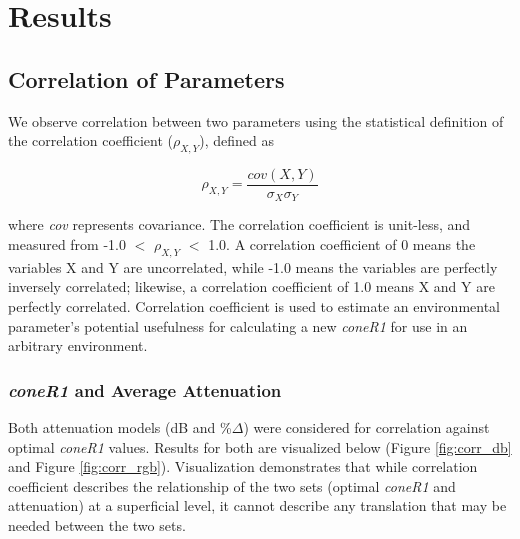 \documentclass[12pt]{report}
\begin{document}
\doublespacing

\clearpage
\chapter{Results}

\section{Correlation of Parameters}

We observe correlation between two parameters using the statistical definition of the correlation coefficient ($\rho_{X,Y}$), defined as

\begin{equation}
\rho_{X,Y} = \dfrac{cov(X,Y)}{\sigma_X\sigma_Y}
\end{equation}

where \textit{cov} represents covariance. The correlation coefficient is unit-less, and measured from -1.0 $<$ $\rho_{X,Y}$ $<$ 1.0. A correlation coefficient of 0 means the variables X and Y are uncorrelated, while -1.0 means the variables are perfectly inversely correlated; likewise, a correlation coefficient of 1.0 means X and Y are perfectly correlated. Correlation coefficient is used to estimate an environmental parameter's potential usefulness for calculating a new \textit{coneR1} for use in an arbitrary environment.

\subsection{\textit{coneR1} and Average Attenuation} \label{section:coner1andatten}

Both attenuation models (dB and \%$\Delta$) were considered for correlation against optimal \textit{coneR1} values. Results for both are visualized below (Figure \ref{fig:corr_db} and Figure \ref{fig:corr_rgb}). Visualization demonstrates that while correlation coefficient describes the relationship of the two sets (optimal \textit{coneR1} and attenuation) at a superficial level, it cannot describe any translation that may be needed between the two sets.
\end{document}
